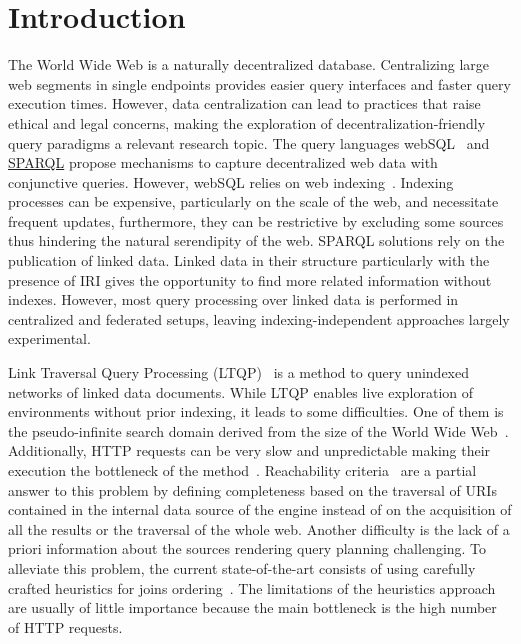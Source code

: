 \section{Introduction}

The World Wide Web is a naturally decentralized database.
Centralizing large web segments in single endpoints provides easier query interfaces and faster query execution times.
However, data centralization can lead to practices that raise ethical and legal concerns, making the exploration of decentralization-friendly query paradigms a relevant research topic.
The query languages webSQL~\cite{Mendelzon1996} and \href{https://www.w3.org/TR/sparql11-query/}{SPARQL} propose mechanisms to capture decentralized web data with conjunctive queries.
However, webSQL relies on web indexing~\cite{Mendelzon1996}.
Indexing processes can be expensive, particularly on the scale of the web, and necessitate frequent updates, furthermore, they can be restrictive by excluding some sources thus hindering the natural serendipity of the web.
SPARQL solutions rely on the publication of linked data.
Linked data in their structure particularly with the presence of IRI gives the opportunity to find more related information without indexes.
However, most query processing over linked data is performed in centralized and federated setups, leaving indexing-independent approaches largely experimental.

Link Traversal Query Processing (LTQP)~\cite{Hartig2012} is a method to query unindexed networks of linked data documents.
While LTQP enables live exploration of environments without prior indexing, it leads to some difficulties.
One of them is the pseudo-infinite search domain derived from the size of the World Wide Web~\cite{hartig2016walking}.
Additionally, HTTP requests can be very slow and unpredictable making their execution the bottleneck of the method~\cite{hartig2016walking}.
Reachability criteria~\cite{Hartig2012} are a partial answer to this problem by defining completeness based on the traversal of URIs
contained in the internal data source of the engine instead of on the acquisition of all the results or the traversal of the whole web.
Another difficulty is the lack of a priori information about the sources rendering query planning challenging.
To alleviate this problem, the current state-of-the-art consists of using carefully crafted heuristics for joins ordering~\cite{Hartig2011}.
The limitations of the heuristics approach are usually of little importance because the main bottleneck is the high number of HTTP requests.

